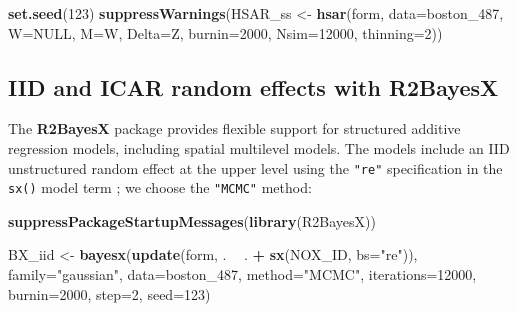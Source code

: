 \documentclass[]{book}
\newenvironment{Shaded}{\begin{snugshade}}{\end{snugshade}}
\newcommand{\DataTypeTok}[1]{\textcolor[rgb]{0.13,0.29,0.53}{#1}}
\newcommand{\DecValTok}[1]{\textcolor[rgb]{0.00,0.00,0.81}{#1}}
\newcommand{\KeywordTok}[1]{\textcolor[rgb]{0.13,0.29,0.53}{\textbf{#1}}}
\newcommand{\NormalTok}[1]{#1}
\newcommand{\OperatorTok}[1]{\textcolor[rgb]{0.81,0.36,0.00}{\textbf{#1}}}
\newcommand{\OtherTok}[1]{\textcolor[rgb]{0.56,0.35,0.01}{#1}}
\newcommand{\StringTok}[1]{\textcolor[rgb]{0.31,0.60,0.02}{#1}}
\begin{document}
\begin{Shaded}
\begin{Highlighting}[]
\KeywordTok{set.seed}\NormalTok{(}\DecValTok{123}\NormalTok{)}
\KeywordTok{suppressWarnings}\NormalTok{(HSAR_ss <-}\StringTok{ }\KeywordTok{hsar}\NormalTok{(form, }\DataTypeTok{data=}\NormalTok{boston_}\DecValTok{487}\NormalTok{, }\DataTypeTok{W=}\OtherTok{NULL}\NormalTok{, }\DataTypeTok{M=}\NormalTok{W, }\DataTypeTok{Delta=}\NormalTok{Z, }
                              \DataTypeTok{burnin=}\DecValTok{2000}\NormalTok{, }\DataTypeTok{Nsim=}\DecValTok{12000}\NormalTok{, }\DataTypeTok{thinning=}\DecValTok{2}\NormalTok{))}
\end{Highlighting}
\end{Shaded}

\begin{Shaded}
\end{Shaded}

\hypertarget{iid-and-icar-random-effects-with-r2bayesx}{%
\subsection{IID and ICAR random effects with R2BayesX}\label{iid-and-icar-random-effects-with-r2bayesx}}

The \textbf{R2BayesX} package \citep{R-R2BayesX} provides flexible support for structured additive regression models, including spatial multilevel models. The models include an IID unstructured random effect at the upper level using the \texttt{"re"} specification in the \texttt{sx()} model term \citep{umlaufetal:15}; we choose the \texttt{"MCMC"} method:

\begin{Shaded}
\begin{Highlighting}[]
\KeywordTok{suppressPackageStartupMessages}\NormalTok{(}\KeywordTok{library}\NormalTok{(R2BayesX))}
\end{Highlighting}
\end{Shaded}

\begin{Shaded}
\begin{Highlighting}[]
\NormalTok{BX_iid <-}\StringTok{ }\KeywordTok{bayesx}\NormalTok{(}\KeywordTok{update}\NormalTok{(form, . }\OperatorTok{~}\StringTok{ }\NormalTok{. }\OperatorTok{+}\StringTok{ }\KeywordTok{sx}\NormalTok{(NOX_ID, }\DataTypeTok{bs=}\StringTok{"re"}\NormalTok{)), }\DataTypeTok{family=}\StringTok{"gaussian"}\NormalTok{,}
    \DataTypeTok{data=}\NormalTok{boston_}\DecValTok{487}\NormalTok{, }\DataTypeTok{method=}\StringTok{"MCMC"}\NormalTok{, }\DataTypeTok{iterations=}\DecValTok{12000}\NormalTok{, }\DataTypeTok{burnin=}\DecValTok{2000}\NormalTok{, }\DataTypeTok{step=}\DecValTok{2}\NormalTok{, }\DataTypeTok{seed=}\DecValTok{123}\NormalTok{)}
\end{Highlighting}
\end{Shaded}
\end{document}
